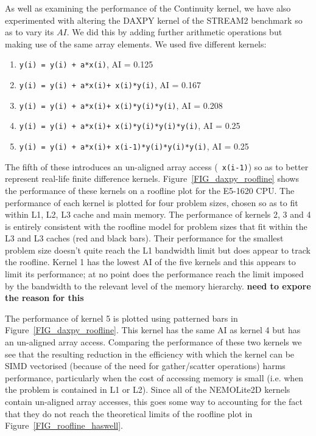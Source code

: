 \documentclass[12pt]{article}
\begin{document}
As well as examining the performance of the Continuity kernel, we have
also experimented with altering the DAXPY kernel of the STREAM2
benchmark so as to vary its $AI$. We did this by adding further
arithmetic operations but making use of the same array
elements. We used five different kernels:
\begin{enumerate}
\item {\tt y(i) = y(i) + a*x(i)}, AI = 0.125
\item {\tt y(i) = y(i) + a*x(i)+ x(i)*y(i)}, AI = 0.167
\item {\tt y(i) = y(i) + a*x(i)+ x(i)*y(i)*y(i)}, AI = 0.208
\item {\tt y(i) = y(i) + a*x(i)+ x(i)*y(i)*y(i)*y(i)}, AI = 0.25
\item {\tt y(i) = y(i) + a*x(i)+ x(i-1)*y(i)*y(i)*y(i)}, AI = 0.25
\end{enumerate}
The fifth of these introduces an un-aligned array access ({\tt
  x(i-1)}) so as to better represent real-life finite difference
kernels.  Figure~\ref{FIG_daxpy_roofline} shows the performance of
these kernels on a roofline plot for the E5-1620 CPU. The performance
of each kernel is plotted for four problem sizes, chosen so as to fit
within L1, L2, L3 cache and main memory. The performance of kernels 2,
3 and 4 is entirely consistent with the roofline model for problem
sizes that fit within the L3 and L3 caches (red and black bars). Their
performance for the smallest problem size doesn't quite reach the L1
bandwidth limit but does appear to track the roofline.  Kernel 1 has
the lowest AI of the five kernels and this appears to limit its
performance; at no point does the performance reach the limit imposed
by the bandwidth to the relevant level of the memory hierarchy. {\bf need to expore the reason for this}

The performance of kernel 5 is plotted using patterned bars in
Figure~\ref{FIG_daxpy_roofline}. This kernel has the same AI as kernel
4 but has an un-aligned array access. Comparing the performance of
these two kernels we see that the resulting reduction in the
efficiency with which the kernel can be SIMD vectorised (because of
the need for gather/scatter operations) harms performance,
particularly when the cost of accessing memory is small (i.e. when the
problem is contained in L1 or L2). Since all of the NEMOLite2D kernels
contain un-aligned array accesses, this goes some way to accounting
for the fact that they do not reach the theoretical limits of the
roofline plot in Figure~\ref{FIG_roofline_haswell}.
\end{document}
